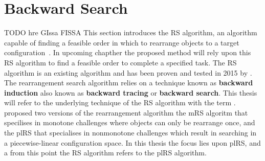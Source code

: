 


%
\section{Backward Search}%
\label{sec:backward_search}
TODO hre GIssa FISSA
This section introduces the \ac{RS} algorithm, an algorithm capable of finding a feasible order in which to rearrange objects to a target configuration~\cite{krontiris_dealing_2015}. In upcoming chapther the proposed method will rely upon this \ac{RS} algorithm to find a feasible order to complete a specified task. The \ac{RS} algorithm is an existing algorithm and has been proven and tested in 2015 by \citeauthor{krontiris_dealing_2015}. The rearrangement search algorithm relies on a technique known as \textbf{backward induction} also known as \textbf{backward tracing} or \textbf{backward search}. This thesis will refer to the underlying technique of the \ac{RS} algorithm with the term . \citeauthor{krontiris_dealing_2015} proposed two versions of the rearrangement algorithm the \ac{mRS} algoritm that specilises in monotone challenges where objects can only be rearrange once, and the \ac{plRS} that specialises in nonmonotone challenges which result in searching in a piecewise-linear configuration space. In this thesis the focus lies upon \ac{plRS}, and a from this point the \ac{RS} algorithm refers to the \ac{plRS} algorithm.\bs
%
